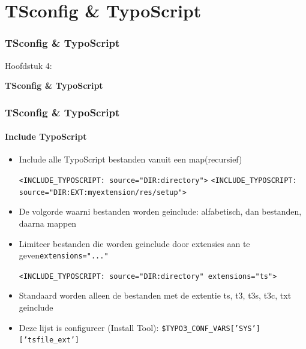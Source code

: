 %

\section{TSconfig \& TypoScript}
\begin{frame}[fragile]
	\frametitle{TSconfig \& TypoScript}

	\begin{center}\huge{Hoofdstuk 4:}\end{center}
	\begin{center}\huge{\color{typo3darkgrey}\textbf{TSconfig \& TypoScript}}\end{center}

\end{frame}


\begin{frame}[fragile]
	\frametitle{TSconfig \& TypoScript}
	\framesubtitle{Include TypoScript}

	\begin{itemize}
		\item Include alle TypoScript bestanden vanuit een map(recursief)

			\lstinline!<INCLUDE_TYPOSCRIPT: source="DIR:directory">!
			\lstinline!<INCLUDE_TYPOSCRIPT: source="DIR:EXT:myextension/res/setup">!

		\item De volgorde waarni bestanden worden geinclude:\newline
			alfabetisch, dan bestanden, daarna mappen
			\item Limiteer bestanden die worden geinclude door extensies aan te geven\texttt{extensions="..."}

			\lstinline!<INCLUDE_TYPOSCRIPT: source="DIR:directory" extensions="ts">!

		\item Standaard worden alleen de bestanden met de extentie ts, t3, t3s, t3c, txt geinclude
		\item Deze lijst is configureer (Install Tool):\newline
			\texttt{\$TYPO3\_CONF\_VARS['SYS']['tsfile\_ext']}
	\end{itemize}

\end{frame}


